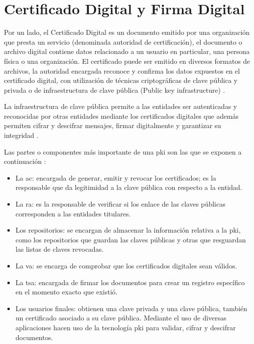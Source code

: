\section{Certificado Digital y Firma Digital}
Por un lado, el Certificado Digital es un documento emitido por una organización que presta un servicio (denominada autoridad de certificación), el 
documento o archivo digital contiene datos relacionado a un usuario en particular, una persona física o una organización. El certificado 
puede ser emitido en diversos formatos de archivos, la autoridad encargada reconoce y confirma los datos expuestos en el certificado 
digital, con utilización de técnicas criptográficas de clave pública y privada o de infraestructura de clave pública (Public key infrastructure) \cite[]{avila_implementacion_2015}.

La infraestructura de clave pública permite a las entidades ser autenticadas y reconocidas por otras entidades mediante los certificados 
digitales que además permiten cifrar y descifrar mensajes, firmar digitalmente y garantizar su integridad \cite[]{avila_implementacion_2015}. 

Las partes o componentes más importante de una \gls{pki} son las que se exponen a continuación \cite[]{avila_implementacion_2015}:

\begin{itemize}
    \item La \gls{ac}: encargada de generar, emitir y revocar los certificados; es la responsable que da  legitimidad a la clave pública con respecto a la  entidad. 

    \item La \gls{ra}: es la responsable de verificar si los enlace de las claves públicas corresponden a las entidades titulares.
    
    \item Los repositorios: se encargan de almacenar la información relativa a la \gls{pki}, como los repositorios que guardan las claves públicas y  otras que resguardan las listas de claves revocadas.

    \item La \gls{va}: se encarga de comprobar que los certificados digitales sean válidos.

    \item La \gls{tsa}: encargada de firmar los documentos para crear un registro específico en el momento exacto que existió.

    \item Los usuarios finales: obtienen una clave privada y una clave pública, también un certificado asociado a su clave pública. Mediante el uso de diversas aplicaciones hacen uso de la tecnología \gls{pki} para validar, cifrar y descifrar documentos.

\end{itemize}

